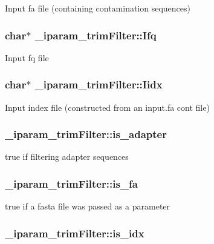 Input fa file (containing contamination sequences) \hypertarget{struct__iparam__trimFilter_a5147310738277c148ca7109ba77829ca}{
\subsubsection[{Ifq}]{\setlength{\rightskip}{0pt plus 5cm}char$\ast$ \+\_\+iparam\+\_\+trim\+Filter\+::\+Ifq}}\label{struct__iparam__trimFilter_a5147310738277c148ca7109ba77829ca}
Input fq file \hypertarget{struct__iparam__trimFilter_a158296e4d37ab3b033c6f9aee1516d71}{
\subsubsection[{Iidx}]{\setlength{\rightskip}{0pt plus 5cm}char$\ast$ \+\_\+iparam\+\_\+trim\+Filter\+::\+Iidx}}\label{struct__iparam__trimFilter_a158296e4d37ab3b033c6f9aee1516d71}
Input index file (constructed from an input.\+fa cont file) \hypertarget{struct__iparam__trimFilter_a6d015b5bf1568c362d9ca0ff37b751f8}{
\subsubsection[{is\+\_\+adapter}]{ \+\_\+iparam\+\_\+trim\+Filter\+::is\+\_\+adapter}}\label{struct__iparam__trimFilter_a6d015b5bf1568c362d9ca0ff37b751f8}
true if filtering adapter sequences \hypertarget{struct__iparam__trimFilter_ac6093d26e41e61f82ffd2aa05f563f9c}{
\subsubsection[{is\+\_\+fa}]{ \+\_\+iparam\+\_\+trim\+Filter\+::is\+\_\+fa}}\label{struct__iparam__trimFilter_ac6093d26e41e61f82ffd2aa05f563f9c}
true if a fasta file was passed as a parameter \hypertarget{struct__iparam__trimFilter_afc50c477a3340ed7befc430d273ff6cb}{
\subsubsection[{is\+\_\+idx}]{ \+\_\+iparam\+\_\+trim\+Filter\+::is\+\_\+idx}}\label{struct__iparam__trimFilter_afc50c477a3340ed7befc430d273ff6cb}
